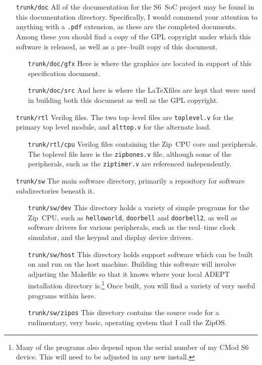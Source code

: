 \documentclass{gqtekspec}
\begin{document}
\begin{itemize}
\begin{itemize}
  \end{itemize}
\item[{\tt trunk/doc}] All of the documentation for the S6~SoC project may be
	found in this documentation directory.  Specifically, I would commend
	your attention to anything with a {\tt .pdf} extension, as these
	are the completed documents.  Among these you should find a copy of the
	GPL copyright under which this software is released, as well as a 
	pre--built copy of this document.
  \begin{itemize}
	\item[{\tt trunk/doc/gfx}] Here is where the graphics are located in
		support of this specification document.
	\item[{\tt trunk/doc/src}] And here is where the \LaTeX files are
		kept that were used in building both this document as well as
		the GPL copyright.
  \end{itemize}
\item[{\tt trunk/rtl}] Verilog files.  The two top--level files are
	{\tt toplevel.v} for the primary top level module, and
	{\tt alttop.v} for the alternate load.
  \begin{itemize}
	\item[{\tt trunk/rtl/cpu}]	Verilog files containing the Zip~CPU
		core and peripherals.  The toplevel file here is the
		{\tt zipbones.v} file, although some of the peripherals, such
		as the {\tt ziptimer.v} are referenced independently.
  \end{itemize}
\item[{\tt trunk/sw}] The main software directory, primarily a repository
	for software subdirectories beneath it.
  \begin{itemize}
	\item[{\tt trunk/sw/dev}]  This directory holds a variety of 
		simple programs for the Zip~CPU, such as {\tt helloworld},
		{\tt doorbell} and {\tt doorbell2}, as well as software drivers
		for various peripherals, such as the real--time clock simulator,
		and the keypad and display device drivers.
	\item[{\tt trunk/sw/host}]  This directory holds support software which
		can be built on and run on the host machine.  Building this
		software will involve adjusting the Makefile so that it knows
		where your local ADEPT installation directory is.\footnote{Many
		of the programs also depend upon the serial number of my CMod
		S6 device.  This will need to be adjusted in any new install.}
		Once built, you will find a variety of very useful programs
		within here. 
	\item[{\tt trunk/sw/zipos}]  This directory contains the source code for
			a rudimentary, very basic, operating system that I
			call the ZipOS. 
  \end{itemize}
\end{itemize}
\end{document}
